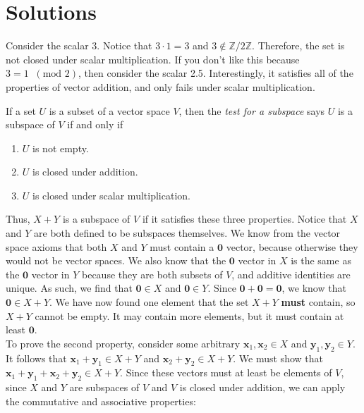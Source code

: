 \documentclass[12pt, letterpaper]{article}
\begin{document}
\section{Solutions}
\begin{solution}
    Consider the scalar \(3\). Notice that \(3\cdot1=3\) and \(3\notin \mathbb{Z}/2\mathbb{Z}\). Therefore, the set is not closed under scalar multiplication. If you don't like this because \(3=1\;\;(\text{mod } 2)\), then consider the scalar 2.5. Interestingly, it satisfies all of the properties of vector addition, and only fails under scalar multiplication.
\end{solution}
\begin{solution}
    If a set \(U\) is a subset of a vector space \(V\), then the \emph{test for a subspace} says \(U\) is a subspace of \(V\) if and only if
    \begin{enumerate}
        \item \(U\) is not empty.
        \item \(U\) is closed under addition.
        \item \(U\) is closed under scalar multiplication.
    \end{enumerate}
    Thus, \(X+Y\) is a subspace of \(V\) if it satisfies these three properties. Notice that \(X\) and \(Y\) are both defined to be subspaces themselves. We know from the vector space axioms that both \(X\) and \(Y\) must contain a \(\mathbf{0}\) vector, because otherwise they would not be vector spaces. We also know that the \(\mathbf{0}\) vector in \(X\) is the same as the \(\mathbf{0}\) vector in \(Y\) because they are both subsets of \(V\), and additive identities are unique. As such, we find that \(\mathbf{0}\in X\) and \(\mathbf{0}\in Y\). Since \(\mathbf{0}+\mathbf{0}=\mathbf{0}\), we know that \(\mathbf{0}\in X+Y\). We have now found one element that the set \(X+Y\) \textbf{must} contain, so \(X+Y\) cannot be empty. It may contain more elements, but it must contain at least \(\mathbf{0}\).\\
    To prove the second property, consider some arbitrary \(\mathbf{x}_1,\mathbf{x}_2\in X\) and \(\mathbf{y}_1,\mathbf{y}_2\in Y\). It follows that \(\mathbf{x}_1 +\mathbf{y}_1 \in X+Y\) and \(\mathbf{x}_2 +\mathbf{y}_2 \in X+Y\). We must show that \(\mathbf{x}_1 +\mathbf{y}_1 +\mathbf{x}_2 +\mathbf{y}_2 \in X+Y\). Since these vectors must at least be elements of \(V\), since \(X\) and \(Y\) are subspaces of \(V\) and \(V\) is closed under addition, we can apply the commutative and associative properties:
    \[
\]
\end{solution}
\end{document}
